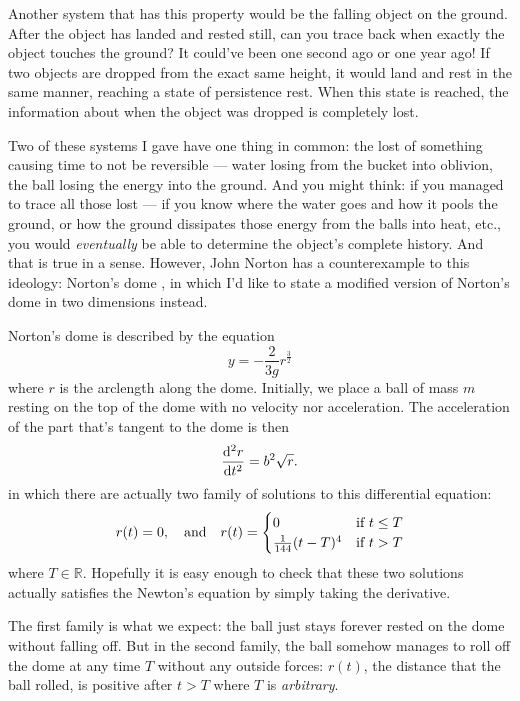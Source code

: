 Another system that has this property would be the falling object on the ground. After
the object has landed and rested still, can you trace back when exactly the object touches
the ground? It could've been one second ago or one year ago! If two objects are dropped from the
exact same height, it would land and rest in the same manner, reaching a state of persistence rest.
When this state is reached, the information about when the object was dropped is completely lost.

Two of these systems I gave have one thing in common: the lost of something causing time
to not be reversible --- water losing from the bucket into oblivion, the ball losing
the energy into the ground. And you might think: if you managed to trace all those lost
--- if you know where the water goes and how it pools the ground, or how the ground
dissipates those energy from the balls into heat, etc., you would \emph{eventually} be
able to determine the object's complete history. And that is true in a sense. However,
John Norton has a counterexample to this ideology: Norton's dome \cite{norton-dome},
in which I'd like to state a modified version of Norton's dome in two dimensions instead.

Norton's dome is described by the equation
\begin{equation}
  y = - \frac{2}{3g} r^{\frac{3}{2}}
\end{equation}
where \(r\) is the arclength along the dome. Initially, we place a ball of mass \(m\)
resting on the top of the dome with no velocity nor acceleration. The acceleration of
the part that's tangent to the dome is then
\begin{equation}
  \odv[ord = 2]{r}{t} = b^2 \sqrt{r}.
\end{equation}
in which there are actually two family of solutions to this differential equation:
\begin{equation}
  r(t) = 0, \quad\textrm{and}\quad r(t)
       = \begin{cases}
           0                      & \textrm{if}~ t \leq T \\
           \frac{1}{144}(t - T)^4 & \textrm{if} ~ t > T
         \end{cases}
\end{equation}
where \(T \in \mathbb{R}\). Hopefully it is easy enough to check that these two solutions
actually satisfies the Newton's equation by simply taking the derivative.

The first family is what we expect: the ball just stays forever rested on the dome
without falling off. But in the second family, the ball somehow manages to roll off
the dome at any time \(T\) without any outside forces: \(r(t)\), the distance that the
ball rolled, is positive after \(t > T\) where \(T\) is \emph{arbitrary}.

